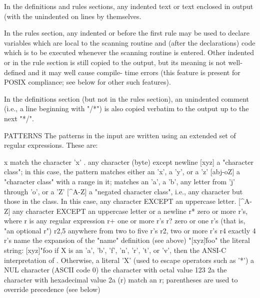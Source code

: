 \documentclass[12pt,spanish,twocolumn,lettersize]{article}
\begin{document}
       In the definitions and rules sections, any  indented  text
       or  text	 enclosed  in %
       output (with the %
       unindented on lines by themselves.

       In  the	rules section, any indented or %
       before the first rule may be  used  to  declare	variables
       which  are  local  to  the scanning routine and (after the
       declarations) code which is to be  executed  whenever  the
       scanning	 routine  is entered.  Other indented or %
       in the rule section is still copied to the output, but its
       meaning is not well-defined and it may well cause compile-
       time errors (this feature is present for POSIX compliance;
       see below for other such features).

       In the definitions section (but not in the rules section),
       an unindented comment (i.e., a line beginning  with  "/*")
       is also copied verbatim to the output up to the next "*/".

PATTERNS
       The patterns in the input are written  using  an	 extended
       set of regular expressions.  These are:

	   x	      match the character 'x'
	   .	      any character (byte) except newline
	   [xyz]      a "character class"; in this case, the pattern
			matches either an 'x', a 'y', or a 'z'
	   [abj-oZ]   a "character class" with a range in it; matches
			an 'a', a 'b', any letter from 'j' through 'o',
			or a 'Z'
	   [^A-Z]     a "negated character class", i.e., any character
			but those in the class.	 In this case, any
			character EXCEPT an uppercase letter.
	   [^A-Z\n]   any character EXCEPT an uppercase letter or
			a newline
	   r*	      zero or more r's, where r is any regular expression
	   r+	      one or more r's
	   r?	      zero or one r's (that is, "an optional r")
	   r{2,5}     anywhere from two to five r's
	   r{2,}      two or more r's
	   r{4}	      exactly 4 r's
	   {name}     the expansion of the "name" definition
		      (see above)
	   "[xyz]\"foo"
		      the literal string: [xyz]"foo
	   \X	      if X is an 'a', 'b', 'f', 'n', 'r', 't', or 'v',
			then the ANSI-C interpretation of \x.
			Otherwise, a literal 'X' (used to escape
			operators such as '*')
	   \0	      a NUL character (ASCII code 0)
	   	      the character with octal value 123
	   \x2a	      the character with hexadecimal value 2a
	   (r)	      match an r; parentheses are used to override
			precedence (see below)
\end{document}
